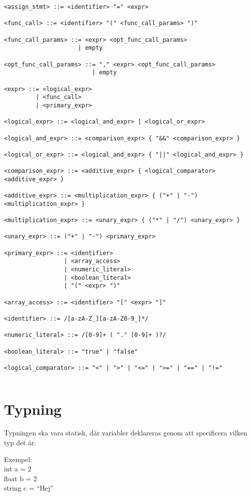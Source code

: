 \documentclass{TDP003mall}
\begin{document}
\begin{verbatim}
<assign_stmt> ::= <identifier> "=" <expr>

<func_call> ::= <identifier> "(" <func_call_params> ")"

<func_call_params> ::= <expr> <opt_func_call_params>
                     | empty

<opt_func_call_params> ::= "," <expr> <opt_func_call_params>
                         | empty

<expr> ::= <logical_expr> 
         | <func_call>
         | <primary_expr>

<logical_expr> ::= <logical_and_expr> | <logical_or_expr>

<logical_and_expr> ::= <comparison_expr> { "&&" <comparison_expr> }

<logical_or_expr> ::= <logical_and_expr> { "||" <logical_and_expr> }

<comparison_expr> ::= <additive_expr> { <logical_comparator> <additive_expr> }

<additive_expr> ::= <multiplication_expr> { ("+" | "-") <multiplication_expr> }

<multiplication_expr> ::= <unary_expr> { ("*" | "/") <unary_expr> }

<unary_expr> ::= ("+" | "-") <primary_expr>

<primary_expr> ::= <identifier> 
                 | <array_access>
                 | <numeric_literal> 
                 | <boolean_literal>
                 | "(" <expr> ")"

<array_access> ::= <identifier> "[" <expr> "]"

<identifier> ::= /[a-zA-Z_][a-zA-Z0-9_]*/

<numeric_literal> ::= /[0-9]+ ( "." [0-9]+ )?/

<boolean_literal> ::= "true" | "false"

<logical_comparator> ::= "<" | ">" | "<=" | ">=" | "==" | "!="
    
\end{verbatim}

    \section{Typning}
    Typningen ska vara statisk, där variabler deklareras genom att specificera vilken typ det är.

    Exempel: \\
    int a = 2 \\
    float b = 2 \\
    string c = ``Hej''
\end{document}
